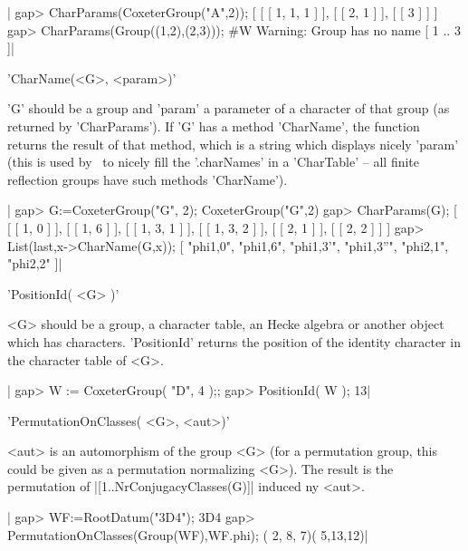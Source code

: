 |    gap> CharParams(CoxeterGroup("A",2));
    [ [ [ 1, 1, 1 ] ], [ [ 2, 1 ] ], [ [ 3 ] ] ]
    gap> CharParams(Group((1,2),(2,3)));
    #W  Warning: Group has no name
    [ 1 .. 3 ]|

%
%

'CharName(<G>, <param>)'

'G' should  be a group  and 'param' a parameter  of a character  of that
group (as returned by 'CharParams'). If 'G' has a method 'CharName', the
function returns  the result  of that  method, which  is a  string which
displays nicely  'param' (this is  used by  \CHEVIE\ to nicely  fill the
'.charNames' in a 'CharTable' --  all finite reflection groups have such
methods 'CharName').

|    gap> G:=CoxeterGroup("G", 2);
    CoxeterGroup("G",2)
    gap> CharParams(G);
    [ [ [ 1, 0 ] ], [ [ 1, 6 ] ], [ [ 1, 3, 1 ] ], [ [ 1, 3, 2 ] ],
      [ [ 2, 1 ] ], [ [ 2, 2 ] ] ]
    gap>  List(last,x->CharName(G,x));
    [ "phi{1,0}", "phi{1,6}", "phi{1,3}'", "phi{1,3}''", "phi{2,1}",
      "phi{2,2}" ]|


'PositionId( <G> )'

<G>  should be  a group,  a character  table, an  Hecke algebra  or another
object  which  has  characters.  'PositionId'  returns  the position of the
identity character in the character table of <G>.

|    gap> W := CoxeterGroup( "D", 4 );;
    gap> PositionId( W );
    13|


'PermutationOnClasses( <G>, <aut>)'

<aut>  is an automorphism of  the group <G> (for  a permutation group, this
could  be  given  as  a  permutation  normalizing  <G>).  The result is the
permutation of |[1..NrConjugacyClasses(G)]| induced ny <aut>.

|    gap> WF:=RootDatum("3D4");
    3D4
    gap> PermutationOnClasses(Group(WF),WF.phi);
    ( 2, 8, 7)( 5,13,12)|


